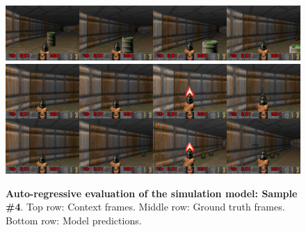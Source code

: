 \documentclass{article} %
\begin{document}
\begin{figure}[h]
    \centering
    \includegraphics[width=1.0\textwidth]{figures/samples/context_7.png}
    \includegraphics[width=1.0\textwidth]{figures/samples/gt_vs_pred_7.png}
    \caption{\textbf{Auto-regressive evaluation of the simulation model: Sample \#4}. Top row: Context frames. Middle row: Ground truth frames. Bottom row: Model predictions.}
    \label{fig:samples_4}
\end{figure}

\clearpage
\end{document}
